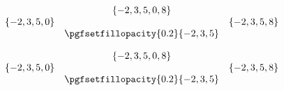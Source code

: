 \documentclass{beamer}
\begin{document}
\begin{frame}
$
\begin{matrix}
          & \{-2,3,5,0,8\} & \\
    \{-2,3,5,0\} & & \{-2,3,5,8\} \\
          & {\pgfsetfillopacity{0.2}\{-2,3,5\}} &
\end{matrix}
$

\end{frame} 




\begin{frame}
$
\begin{matrix}
          & \{-2,3,5,0,8\} & \\
    \{-2,3,5,0\} & & \{-2,3,5,8\} \\
          & {\pgfsetfillopacity{0.2}\{-2,3,5\}} &
\end{matrix}
$

\end{frame}     
\end{document}
